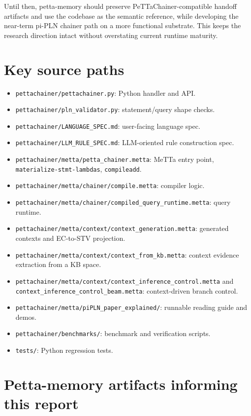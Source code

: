 \documentclass[11pt]{article}
\newcommand{\code}[1]{\texttt{#1}}
\newcommand{\fpath}[1]{\texttt{#1}}
\begin{document}
Until then, petta-memory should preserve PeTTaChainer-compatible handoff
artifacts and use the codebase as the semantic reference, while developing the
near-term pi-PLN chainer path on a more functional substrate.  This keeps the
research direction intact without overstating current runtime maturity.

\appendix
\section{Key source paths}

\begin{itemize}
  \item \fpath{pettachainer/pettachainer.py}: Python handler and API.
  \item \fpath{pettachainer/pln\_validator.py}: statement/query shape checks.
  \item \fpath{pettachainer/LANGUAGE\_SPEC.md}: user-facing language spec.
  \item \fpath{pettachainer/LLM\_RULE\_SPEC.md}: LLM-oriented rule construction spec.
  \item \fpath{pettachainer/metta/petta\_chainer.metta}: MeTTa entry point,
  \code{materialize-stmt-lambdas}, \code{compileadd}.
  \item \fpath{pettachainer/metta/chainer/compile.metta}: compiler logic.
  \item \fpath{pettachainer/metta/chainer/compiled\_query\_runtime.metta}: query runtime.
  \item \fpath{pettachainer/metta/context/context\_generation.metta}: generated
  contexts and EC-to-STV projection.
  \item \fpath{pettachainer/metta/context/context\_from\_kb.metta}: context
  evidence extraction from a KB space.
  \item \fpath{pettachainer/metta/context/context\_inference\_control.metta} and
  \fpath{context\_inference\_control\_beam.metta}: context-driven branch control.
  \item \fpath{pettachainer/metta/piPLN\_paper\_explained/}: runnable reading
  guide and demos.
  \item \fpath{pettachainer/benchmarks/}: benchmark and verification scripts.
  \item \fpath{tests/}: Python regression tests.
\end{itemize}

\section{Petta-memory artifacts informing this report}
\end{document}
